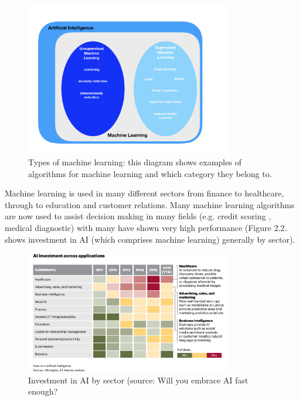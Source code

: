 \begin{figure}[H]
\centering
\includegraphics[width=0.8\textwidth]{ThesisTemplate/usingLatex/images/Figure1.png}
\caption{Types of machine learning: this diagram shows examples of algorithms for machine learning and which category they belong to.}
 \label{fig:machineLearning}
\end{figure}


Machine learning is used in many different sectors from finance to healthcare, through to education and customer relations. Many machine learning algorithms are now used to assist decision making in many fields (e.g. credit scoring \citep{Guegan:2018ey}, medical diagnostic) with many have shown very high performance (Figure 2.2. shows investment in AI (which comprises machine learning) generally by sector).

\begin{figure}[H]
\centering
\includegraphics[width=0.8\textwidth]{ThesisTemplate/usingLatex/images/fig2_2.png}
\caption{Investment in AI by sector (source: Will you embrace AI fast enough? \citep{Evans:sHGdqFvY}}
\label{fig:investement}
\end{figure}

